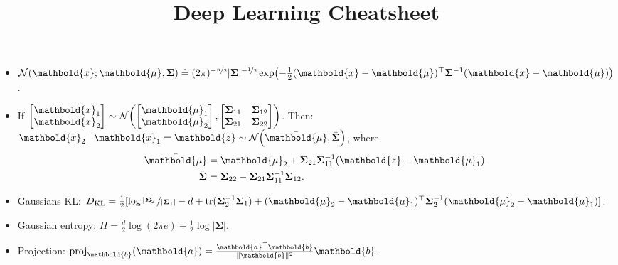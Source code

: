 \documentclass[9pt]{extarticle}
\title{Deep Learning Cheatsheet}
\renewcommand{\det}[1]{|#1|}
\renewcommand{\mat}[1]{\ensuremath{\mathbf{#1}}}
\renewcommand{\vec}[1]{\ensuremath{\mathbold{#1}}}
\begin{document}
\setlength{\columnsep}{0.25cm}

\begin{multicols*}{3}

    \begin{itemize}[left=0pt]
        \item $\mathcal{N}(\vec{x}; \vec{\mu}, \mat{\Sigma}) \doteq (2\pi)^{-\nicefrac{n}{2}}
                  \det{\mat{\Sigma}}^{-\nicefrac{1}{2}} \exp \lft( -\frac{1}{2}\transpose{(\vec{x} - \vec{\mu})}
                  \inv{\mat{\Sigma}}(\vec{x} - \vec{\mu}) \rgt)$.

        \item If $\begin{bmatrix} \vec{x}_1 \\ \vec{x}_2 \end{bmatrix} \sim \mathcal{N}\lft( \begin{bmatrix} \vec{\mu}_1 \\ \vec{\mu}_2 \end{bmatrix}, \begin{bmatrix} \mat{\Sigma}_{11} & \mat{\Sigma}_{12} \\ \mat{\Sigma}_{21} & \mat{\Sigma}_{22} \end{bmatrix} \rgt)$.
              Then: $\vec{x}_2 \mid \vec{x}_1 = \vec{z} \sim \mathcal{N}\lft( \bar{\vec{\mu}}, \bar{\mat{\Sigma}}
                  \rgt)$, where
              \begin{align*}
                  \bar{\vec{\mu}}    & = \vec{\mu}_2 + \mat{\Sigma}_{21} \inv{\mat{\Sigma}_{11}} (\vec{z} - \vec{\mu}_1)  \\
                  \bar{\mat{\Sigma}} & = \mat{\Sigma}_{22} - \mat{\Sigma}_{21} \inv{\mat{\Sigma}_{11}} \mat{\Sigma}_{12}.
              \end{align*}

        \item Gaussians KL: $D_{\mathrm{KL}} = \frac{1}{2} [ \log
                      \nicefrac{\det{\mat{\Sigma}_2}}{\det{\mat{\Sigma}_1}} - d + \mathrm{tr}(\inv{\mat{\Sigma}_2}
                      \mat{\Sigma}_1) + \transpose{(\vec{\mu}_2 - \vec{\mu}_1)} \inv{\mat{\Sigma}_2} (\vec{\mu}_2 -
                      \vec{\mu}_1) ]$.

        \item Gaussian entropy: $H = \frac{d}{2} \log(2\pi e) + \frac{1}{2} \log \det{\mat{\Sigma}}$.

        \item Projection: $\mathrm{proj}_{\vec{b}} (\vec{a}) = \frac{\transpose{\vec{a}} \vec{b}}{\| \vec{b}
                      \|^2} \vec{b}$.


\end{itemize}
\end{multicols*}
\end{document}
